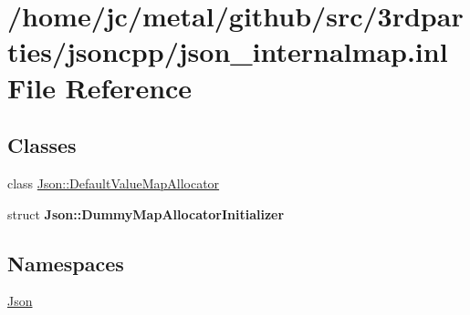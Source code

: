 \hypertarget{json__internalmap_8inl}{}\section{/home/jc/metal/github/src/3rdparties/jsoncpp/json\+\_\+internalmap.inl File Reference}
\label{json__internalmap_8inl}
\subsection*{Classes}
\begin{DoxyCompactItemize}
\item 
class \hyperlink{classJson_1_1DefaultValueMapAllocator}{Json\+::\+Default\+Value\+Map\+Allocator}
\item 
struct {\bfseries Json\+::\+Dummy\+Map\+Allocator\+Initializer}
\end{DoxyCompactItemize}
\subsection*{Namespaces}
\begin{DoxyCompactItemize}
\item 
 \hyperlink{namespaceJson}{Json}
\end{DoxyCompactItemize}

